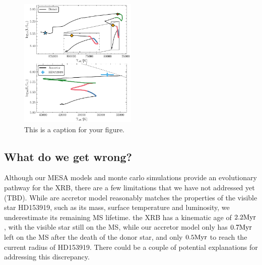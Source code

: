 \documentclass[linenumbers,trackchanges,twocolumn]{aastex701}
\begin{document}
\begin{figure}[htbp]
    \centering
    \includegraphics[width=0.5\textwidth]{xrb_fiducial_hr.pdf}
    \caption{This is a caption for your figure.}
    \label{fig:xrb_fiducial_hr}
\end{figure}

\subsection{What do we get wrong?}

Although our MESA models and monte carlo simulations provide an evolutionary pathway for the XRB, there are a few limitations that we have not addressed yet (TBD). While are accretor model reasonably matches the properties of the visible star HD153919, such as its mass, surface temperature and luminosity, we underestimate its remaining MS lifetime. the XRB has a kinematic age of $2.2\rm Myr$, with the visible star still on the MS, while our accretor model only has $0.7\rm Myr$ left on the MS after the death of the donor star, and only $0.5\rm Myr$ to reach the current radius of HD153919. There could be a couple of potential explanations for addressing this discrepancy. 
\end{document}
